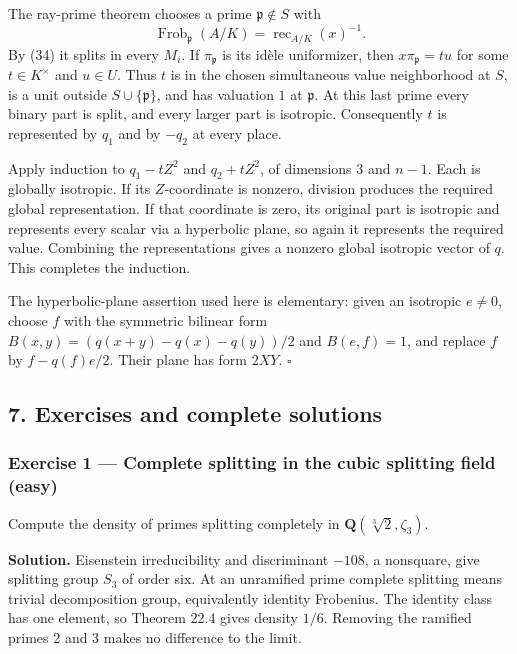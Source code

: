 \documentclass[11pt,a4paper]{article}
\begin{document}
The ray-prime theorem chooses a prime \(\mathfrak p\notin S\) with \[
\operatorname{Frob}_{\mathfrak p}(A/K)
=\operatorname{rec}_{A/K}(x)^{-1}.
\] By (34) it splits in every \(M_i\). If \(\pi_{\mathfrak p}\) is its
idèle uniformizer, then \(x\pi_{\mathfrak p}=t u\) for some
\(t\in K^\times\) and \(u\in U\). Thus \(t\) is in the chosen
simultaneous value neighborhood at \(S\), is a unit outside
\(S\cup\{\mathfrak p\}\), and has valuation \(1\) at \(\mathfrak p\). At
this last prime every binary part is split, and every larger part is
isotropic. Consequently \(t\) is represented by \(q_1\) and by \(-q_2\)
at every place.

Apply induction to \(q_1-tZ^2\) and \(q_2+tZ^2\), of dimensions \(3\)
and \(n-1\). Each is globally isotropic. If its \(Z\)-coordinate is
nonzero, division produces the required global representation. If that
coordinate is zero, its original part is isotropic and represents every
scalar via a hyperbolic plane, so again it represents the required
value. Combining the representations gives a nonzero global isotropic
vector of \(q\). This completes the induction.

The hyperbolic-plane assertion used here is elementary: given an
isotropic \(e\ne0\), choose \(f\) with the symmetric bilinear form
\(B(x,y)=(q(x+y)-q(x)-q(y))/2\) and \(B(e,f)=1\), and replace \(f\) by
\(f-q(f)e/2\). Their plane has form \(2XY\). \(\square\)

\subsection{7. Exercises and complete
solutions}\label{exercises-and-complete-solutions}

\subsubsection{Exercise 1 --- Complete splitting in the cubic splitting
field
(easy)}\label{exercise-1-complete-splitting-in-the-cubic-splitting-field-easy}

Compute the density of primes splitting completely in
\(\mathbf Q(\sqrt[3]2,\zeta_3)\).

\textbf{Solution.} Eisenstein irreducibility and discriminant \(-108\),
a nonsquare, give splitting group \(S_3\) of order six. At an unramified
prime complete splitting means trivial decomposition group, equivalently
identity Frobenius. The identity class has one element, so Theorem 22.4
gives density \(1/6\). Removing the ramified primes 2 and 3 makes no
difference to the limit.
\end{document}
